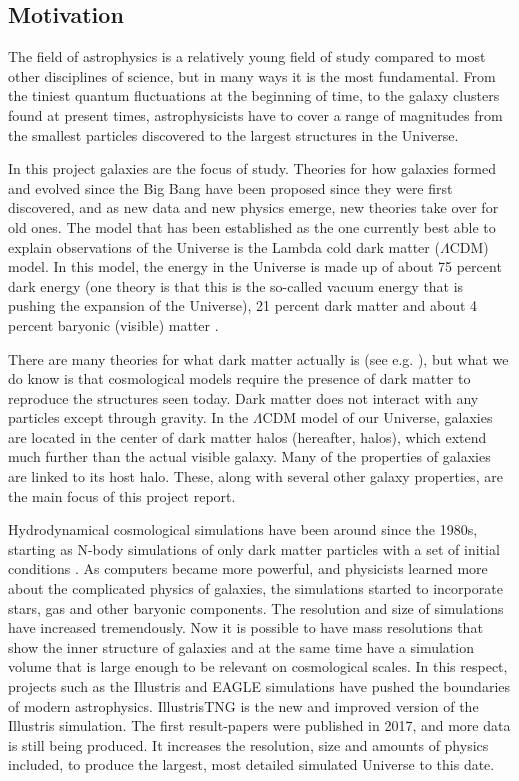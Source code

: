 
\noindent
\subsection{Motivation}
The field of astrophysics is a relatively young field of study compared to most other disciplines of science, but in many ways it is the most fundamental. From the tiniest quantum fluctuations at the beginning of time, to the galaxy clusters found at present times, astrophysicists have to cover a range of magnitudes from the smallest particles discovered to the largest structures in the Universe. 

In this project galaxies are the focus of study. Theories for how galaxies formed and evolved since the Big Bang have been proposed since they were first discovered, and as new data and new physics emerge, new theories take over for old ones. The model that has been established as the one currently best able to explain observations of the Universe is the Lambda cold dark matter ($\Lambda$CDM) model. In this model, the energy in the Universe is made up of about 75 percent dark energy (one theory is that this is the so-called vacuum energy that is pushing the expansion of the Universe), 21 percent dark matter and about 4 percent baryonic (visible) matter \parencite{Planck2015}. 

There are many theories for what dark matter actually is (see e.g. \textcite{Boveia2018}), but what we do know is that cosmological models require the presence of dark matter to reproduce the structures seen today. Dark matter does not interact with any particles except through gravity. In the $\Lambda$CDM model of our Universe, galaxies are located in the center of dark matter halos (hereafter, halos), which extend much further than the actual visible galaxy. Many of the properties of galaxies are linked to its host halo. These, along with several other galaxy properties, are the main focus of this project report.

Hydrodynamical cosmological simulations have been around since the 1980s, starting as N-body simulations of only dark matter particles with a set of initial conditions \parencite{Frenk1983}. As computers became more powerful, and physicists learned more about the complicated physics of galaxies, the simulations started to incorporate stars, gas and other baryonic components. The resolution and size of simulations have increased tremendously. Now it is possible to have mass resolutions that show the inner structure of galaxies and at the same time have a simulation volume that is large enough to be relevant on cosmological scales. In this respect, projects such as the Illustris and EAGLE simulations have pushed the boundaries of modern astrophysics. IllustrisTNG is the new and improved version of the Illustris simulation. The first result-papers were published in 2017, and more data is still being produced. It increases the resolution, size and amounts of physics included, to produce the largest, most detailed simulated Universe to this date. 


